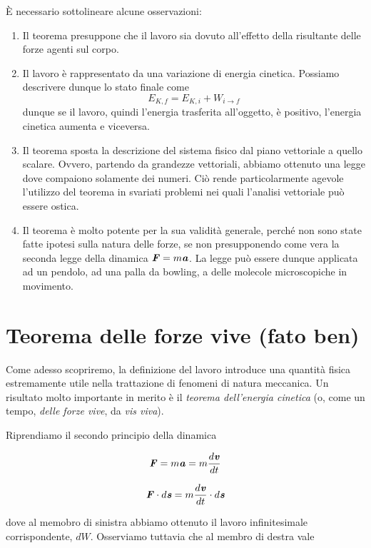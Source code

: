 \noindent È necessario sottolineare alcune osservazioni:
\begin{enumerate}
    \item Il teorema presuppone che il lavoro sia dovuto all'effetto della risultante delle forze agenti sul corpo.
    \item Il lavoro è rappresentato da una variazione di energia cinetica. Possiamo descrivere dunque lo stato finale
    come \[ E_{K,f} = E_{K,i} + W_{i\to f} \] dunque se il lavoro, quindi l'energia trasferita all'oggetto, è positivo,
    l'energia cinetica aumenta e viceversa.

    \item Il teorema sposta la descrizione del sistema fisico dal piano vettoriale a quello scalare. Ovvero, partendo
    da grandezze vettoriali, abbiamo ottenuto una legge dove compaiono solamente dei numeri. Ciò rende particolarmente agevole
    l'utilizzo del teorema in svariati problemi nei quali l'analisi vettoriale può essere ostica.

    \item Il teorema è molto potente per la sua validità generale, perché non sono state fatte ipotesi sulla natura delle
    forze, se non presupponendo come vera la seconda legge della dinamica $\textbf{\textit{F}} = m\textbf{\textit{a}}$.
    La legge può essere dunque applicata ad un pendolo, ad una palla da bowling,
    a delle molecole microscopiche in movimento.
\end{enumerate}

\section*{Teorema delle forze vive (fato ben)}
Come adesso scopriremo, la definizione del lavoro introduce una
quantità fisica estremamente utile nella trattazione di fenomeni
di natura meccanica. Un risultato molto importante in merito è
il \textit{teorema dell'energia cinetica} (o, come un tempo,
\textit{delle forze vive}, da \textit{vis viva}).

Riprendiamo il secondo principio della dinamica

\[ \textbf{\textit{F}} = m \textbf{\textit{a}} = m \frac{d\textbf{\textit{v}}}{dt} \]



\[ \textbf{\textit{F}} \cdot d\textbf{\textit{s}} = m \frac{d\textbf{\textit{v}}}{dt} \cdot d\textbf{\textit{s}} \]

\noindent dove al memobro di sinistra abbiamo ottenuto il lavoro
infinitesimale corrispondente, $dW$. Osserviamo tuttavia che
al membro di destra vale

